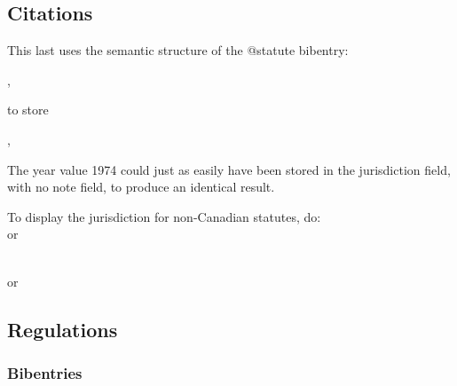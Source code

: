 \subsection{Citations}

\bigskip


\par\bigskip
{}\par\bigskip
{}\par\bigskip
{}\par\bigskip

This last uses the semantic structure of the @statute bibentry:\medskip

,   \medskip

to store\medskip

,  \fbox{\strut \ } \medskip

The year value 1974 could just as easily have been stored in the jurisdiction field, with no note field, to produce an identical result.\bigskip

\noindent To display the jurisdiction for non-Canadian statutes, do:\\
	{\footnotesize\textcolor{blue}{}}
	or
	{\footnotesize\textcolor{blue}{}}
   \toggletrue{statjurisdiction}

   \\
	{\footnotesize\textcolor{blue}{}}
	or
	{\footnotesize\textcolor{blue}{}}
	\togglefalse{statjurisdiction}\par\bigskip






\subsection{Regulations}
\subsubsection{Bibentries}

